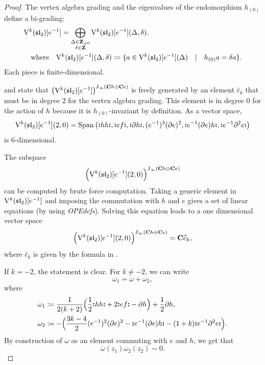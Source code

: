 \begin{proof}
	The vertex algebra grading and the eigenvalues of the endomorphism $h_{(0)}$ define a bi-grading:
	\[ \begin{multlined}
		\V^k(\sl_2)[e^{-1}] = \bigoplus_{\substack{\Delta \in \Z_{\geqslant 0} \\ \delta \in \Z}} \V^k(\sl_2)[e^{-1}](\Delta, \delta), \\
		\text{where} \quad \V^k(\sl_2)[e^{-1}](\Delta, \delta) \coloneqq \{ a \in \V^k(\sl_2)[e^{-1}](\Delta) \quad | \quad h_{(0)} a = \delta a \}.
	\end{multlined}  \]
	Each piece is finite-dimensional. 
	
	 and  state that $ \big(\mathrm V^k(\mathfrak{sl}_2)[e^{-1}]\big)^{\mathrm{J}_\infty(\mathbf{C} h \oplus \mathbf{C} e)}$ is freely generated by an element $\widehat{c}_k $ that must be in degree $2$ for the vertex algebra grading. This element is in degree $0$ for the action of $h$ because it is $h_{(0)}$-invariant by definition. As a vector space,
	\[ \mathrm V^k(\mathfrak{sl}_2)[e^{-1}](2, 0) = \operatorname{Span}\big(\mathopen{\boldsymbol{\vcentcolon}}h h\mathclose{\boldsymbol{\vcentcolon}},  \mathopen{\boldsymbol{\vcentcolon}}e f\mathclose{\boldsymbol{\vcentcolon}}, \mathopen{\boldsymbol{\vcentcolon}}\partial h\mathclose{\boldsymbol{\vcentcolon}}, (e^{-1})^2 (\partial e)^2, \mathopen{\boldsymbol{\vcentcolon}}e^{-1} (\partial e) h\mathclose{\boldsymbol{\vcentcolon}}, \mathopen{\boldsymbol{\vcentcolon}}e^{-1} \partial^2 e\mathclose{\boldsymbol{\vcentcolon}}\big)  \]
	is $6$-dimensional.
	
	The subspace 
	\[ \Big(\mathrm V^k(\mathfrak{sl}_2)[e^{-1}](2, 0)\Big)^{\mathrm{J}_\infty(\mathbf{C} h \oplus \mathbf{C} e)}  \] 
	can be computed by brute force computation. Taking a generic element in $\mathrm V^k(\mathfrak{sl}_2)[e^{-1}]$ and imposing the commutation with $h$ and $e$ gives a set of linear equations (by using \emph{OPEdefs}). Solving this equation leads to a one dimensional vector space
	\[ \Big(\mathrm V^k(\mathfrak{sl}_2)[e^{-1}](2, 0)\Big)^{\mathrm{J}_\infty(\mathbf{C} h \oplus \mathbf{C} e)}  = \mathbf{C} \widehat{c}_k, \]
	where $\widehat{c}_k$ is given by the formula in .
	
	If $k = -2$, the statement is clear. For $k \neq -2$, we can write
	\[ \omega_1 = \omega + \omega_2, \]
	where
	\[ \begin{aligned}
		\omega_1 & \coloneqq \frac{1}{2(k + 2)} \Big(\frac{1}{2} \mathopen{\boldsymbol{\vcentcolon}}h h\mathclose{\boldsymbol{\vcentcolon}} + 2 \mathopen{\boldsymbol{\vcentcolon}}e f\mathclose{\boldsymbol{\vcentcolon}} - \partial h\Big) + \frac{1}{2} \partial h, \\
		\omega_2 & \coloneqq - \Big(\frac{3 k - 4}{2} (e^{-1})^2 (\partial e)^2 -  \mathopen{\boldsymbol{\vcentcolon}}e^{-1} (\partial e) h\mathclose{\boldsymbol{\vcentcolon}} - (1+k) \mathopen{\boldsymbol{\vcentcolon}}e^{-1} \partial^2 e\mathclose{\boldsymbol{\vcentcolon}}\Big).
	\end{aligned} \]
	By construction of $\omega$ as an element commuting with $e$ and $h$, we get that
	\[ \omega(z_1) \omega_2(z_2) \sim 0. \]
	

\end{proof}

